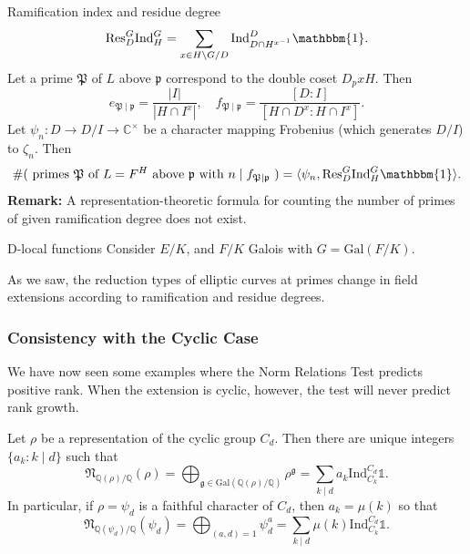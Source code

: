 \documentclass{beamer}
\newcommand{\Gal}{\mathrm{Gal}}
\newcommand{\trivial}{\mathbbm{1}}
\newcommand{\Ind}{\mathrm{Ind}}
\newcommand{\Res}{\mathrm{Res}}
\newcommand{\QQ}{\mathbb{Q}}
\newcommand{\bQ}{\mathbb{Q}}
\newcommand{\bC}{\mathbb{C}}
\newcommand{\fP}{\mathfrak{P}}
\newcommand{\fp}{\mathfrak{p}}
\newcommand{\fN}{\mathfrak{N}}
\newcommand{\repnorm}[1]{\fN_{\bQ(#1) / \bQ}(#1)}
\theoremstyle{plain}
\begin{document}
\begin{frame}{Ramification index and residue degree}
    \[ \Res_D^G \Ind_H^G = \sum_{x \in H\backslash G / D} \Ind_{D \cap H^{x^{-1}}}^D \trivial. \]
    Let a prime $\fP$ of $L$ above $\fp$ correspond to the double coset $D_p x H$. \pause Then 
    \[ e_{\fP \mid \fp} = \frac{|I|}{|H \cap I^{x}|}, \quad  f_{\fP \mid \fp} = \frac{[D : I]}{[H \cap D^{x} : H \cap I^x]}.\] \pause 
    Let $\psi_n \colon D \to D / I \to \bC^{\times}$ be a character mapping Frobenius (which generates $D/ I$) to $\zeta_n$. Then 
    \[ \# (\text{ primes $\fP$ of $L = F^H$ above $\fp$ with $n \mid f_{\fP \mid \fp}$ }) = \langle \psi_n , \Res_D^G \Ind_H^G \trivial\rangle.  \] \pause 
    \textbf{Remark:}
        A representation-theoretic formula for counting the number of primes of given ramification degree does not exist. 
\end{frame}

\begin{frame}{D-local functions}
    Consider $E / K$, and $F / K$ Galois with $G = \Gal(F / K)$. 
    
    As we saw, the reduction types of elliptic curves at primes change in field extensions according to ramification and residue degrees.\pause
\end{frame}

\begin{frame}
    \frametitle{Consistency with the Cyclic Case}
    We have now seen some examples where the Norm Relations Test predicts positive rank. When the extension is cyclic, however, the test will never predict rank growth. \pause

    \begin{lemma}
        Let $\rho$ be a representation of the cyclic group $C_d$. Then there are unique integers $\{a_k:k\mid d\}$ such that 
        $$\repnorm{\rho}=\bigoplus_{\mathfrak{g}\in\Gal(\QQ(\rho)/\QQ)}\rho^{\mathfrak{g}}=\sum_{k\mid d}a_k\Ind_{C_k}^{C_d}\mathds{1}.$$
        \pause In particular, if $\rho=\psi_d$ is a faithful character of $C_d$, then $a_k=\mu(k)$ so that
        $$\repnorm{\psi_d}=\bigoplus_{(a,d)=1}\psi_d^a=\sum_{k\mid d}\mu(k)\Ind_{C_k}^{C_d}\mathds{1}.$$
    \end{lemma}

\end{frame}
\end{document}
